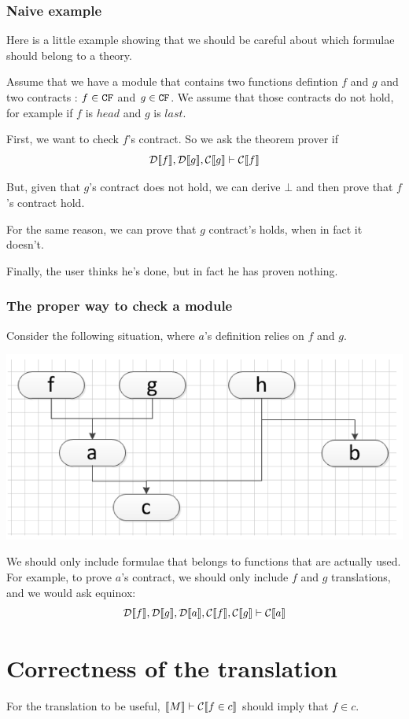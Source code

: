\documentclass[preprint]{sigplanconf}
\begin{document}
\subsubsection{Naive example}
Here is a little example showing that we should be careful about which
formulae should belong to a theory.

Assume that we have a module that contains two functions defintion $f$
and $g$ and two contracts : $f \in \texttt{CF}$ and $g \in \texttt{CF}$. We assume
that those contracts do not hold, for example if $f$ is $head$ and $g$
is $last$.

First, we want to check $f$'s contract. So we ask the theorem prover
if
$$ \mathcal{D} \llbracket f \rrbracket, \mathcal{D} \llbracket g \rrbracket, \mathcal{C} \llbracket g \rrbracket \vdash \mathcal{C} \llbracket f \rrbracket $$

But, given that $g$'s contract does not hold, we can derive $\bot$ and
then prove that $f$'s contract hold.

For the same reason, we can prove that $g$ contract's holds, when in
fact it doesn't.

Finally, the user thinks he's done, but in fact he has proven nothing.

\subsubsection{The proper way to check a module}
Consider the following situation, where $a$'s definition relies on $f$
and $g$.
\begin{center}
\includegraphics[scale=0.3]{flow.png}
\end{center}

We should only include formulae that belongs to functions that are
actually used. For example, to prove $a$'s contract, we should only
include $f$ and $g$ translations, and we would ask equinox:
$$ \mathcal{D} \llbracket f \rrbracket,\mathcal{D} \llbracket g \rrbracket,\mathcal{D} \llbracket a \rrbracket,\mathcal{C} \llbracket f \rrbracket,\mathcal{C} \llbracket g \rrbracket \vdash
\mathcal{C} \llbracket a \rrbracket$$


\section{Correctness of the translation}
For the translation to be useful, $\llbracket M \rrbracket \vdash \mathcal{C} \llbracket f \in c \rrbracket $
should imply that $f \in c$.
\end{document}
